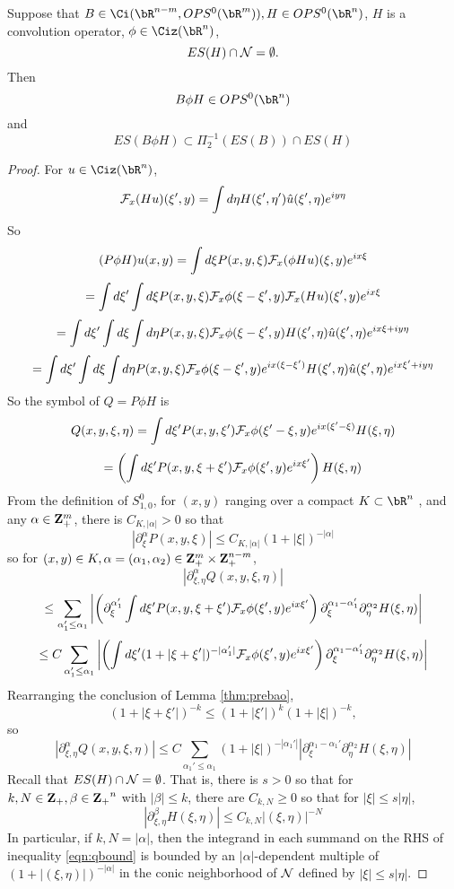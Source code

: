 \begin{proposition}
  \label{thm:bao1}
  Suppose that $B \in \Ci(\bR^{n-m},OPS^0(\bR^m)), H \in OPS^0(\bR^n)$, $H$ is a convolution operator, $\phi \in \Ciz(\bR^n)$,
  \[
    ES(H) \cap {\cal N} = \emptyset.
  \]
  Then
  \[
    B\phi H \in OPS^0(\bR^n)
  \]
  and
  \[
    ES(B\phi H) \subset \Pi_2^{-1}(ES(B)) \cap ES(H)
  \]
\end{proposition}

\begin{proof}
  For $u \in \Ciz(\bR^n)$,
  \[
    {\cal F}_x(Hu)(\xi',y) = \int  d\eta H(\xi',\eta')\hat{u}(\xi',\eta)e^{ i y \eta}
  \]
  So
  \[
    (P\phi H)u(x,y) = \int d \xi P(x,y,\xi) {\cal F}_x(\phi Hu)(\xi,y)e^{i x\xi}
  \]
  \[
    =\int d \xi' \int d \xi P(x,y,\xi) {\cal F}_x\phi(\xi-\xi',y) {\cal F}_x(Hu)(\xi',y)e^{i x\xi}
  \]
  \[
   =\int d \xi' \int d \xi \int d\eta P(x,y,\xi) {\cal F}_x\phi(\xi-\xi',y) H(\xi',\eta)\hat{u}(\xi',\eta)e^{i x\xi + i y\eta }
  \]
  \[
    =\int d \xi' \int d \xi \int d\eta P(x,y,\xi) {\cal F}_x\phi(\xi-\xi',y) e^{ix(\xi-\xi')}H(\xi',\eta)\hat{u}(\xi',\eta)e^{i x\xi' + i y\eta }
  \]
  So the symbol of $Q = P \phi H$ is
  \[
    Q(x,y,\xi,\eta) = \int d\xi' P(x,y,\xi') {\cal F}_x\phi(\xi'-\xi,y) e^{i x(\xi'-\xi)}H(\xi,\eta)
  \]
  \[
    = \left(\int d\xi' P(x,y,\xi+\xi') {\cal F}_x\phi(\xi',y) e^{i x\xi'}\right) H(\xi,\eta)
  \]
  From the definition of $S^0_{1,0}$, for $(x,y)$ ranging over a compact $K \subset \bR^n$ , and any $\alpha \in {\bf Z}_+^m$, there is $C_{K,|\alpha|} > 0$ so that
  \[
    |\partial^{\alpha}_{\xi} P(x,y,\xi)| \le C_{K,|\alpha|}(1 + |\xi|)^{-|\alpha|}
  \]
  so for $(x,y) \in K, \alpha=(\alpha_1,\alpha_2) \in {\bf Z}_+^m \times {\bf Z}_+^{n-m}$,
  \[
    |\partial_{\xi,\eta}^{\alpha} Q(x,y,\xi,\eta)|
  \]
  \[
    \le \sum_{\alpha_1' \le \alpha_1} \left|\left(\partial_{\xi}^{\alpha_1'}  \int d\xi' P(x,y,\xi+\xi') {\cal F}_x\phi(\xi',y) e^{i x\xi'}\right)\partial_{\xi}^{\alpha_1-\alpha_1'} \partial_{\eta}^{\alpha_2}H(\xi,\eta)       \right|
  \]
  \[
    \le C \sum_{\alpha_1' \le \alpha_1} \left|\left(  \int d\xi' (1 + |\xi+\xi'|)^{-|\alpha_1'|} {\cal F}_x\phi(\xi',y) e^{i x\xi'}\right)\partial_{\xi}^{\alpha_1-\alpha_1'} \partial_{\eta}^{\alpha_2}H(\xi,\eta)       \right|
  \]
  Rearranging the conclusion of Lemma \ref{thm:prebao},
  \[
    (1 + |\xi + \xi'|)^{-k} \le (1+|\xi'|)^k(1+|\xi|)^{-k},
  \]
  so
  \begin{equation}
    \label{eqn:qbound}
    |\partial_{\xi,\eta}^{\alpha} Q(x,y,\xi,\eta)| \le C \sum_{\alpha_1' \le \alpha_1} (1 + |\xi|)^{-|\alpha_1'|}|\partial_{\xi}^{\alpha_1-\alpha_1'}\partial_{\eta}^{\alpha_2}H(\xi,\eta) |
  \end{equation}
  Recall that $ES(H) \cap {\cal N} = \emptyset$. That is, there is $s>0$ so that for
  $k,N \in {\bf Z}_+, \beta \in {\bf Z_+}^n$ with $|\beta| \le k$, there are $C_{k,N} \ge 0$ so that for $|\xi| \le s|\eta|$,
  \[
    |\partial_{\xi,\eta}^{\beta}H(\xi,\eta)| \le C_{k,N} |(\xi,\eta)|^{-N}
  \]
  In particular, if $k, N = |\alpha|$, then the integrand in each summand on the RHS of inequality \ref{eqn:qbound} is bounded by an $|\alpha|$-dependent multiple of $(1+|(\xi,\eta)|)^{-|\alpha|}$ in the conic neighborhood of ${\cal N}$ defined by $|\xi| \le s|\eta|$. 


\end{proof}
